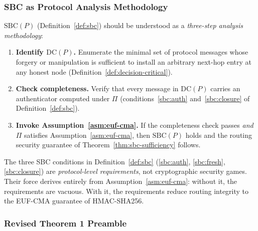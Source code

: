 \subsubsection*{SBC as Protocol Analysis Methodology}

\begin{remark}
\label{rem:sbc-methodology}
$\mathrm{SBC}(P)$ (Definition~\ref{def:sbc}) should be understood as a
\emph{three-step analysis methodology}:

\begin{enumerate}[label=\textbf{Step~\arabic*.}, leftmargin=2.5em]
  \item \textbf{Identify $\mathrm{DC}(P)$.}  Enumerate the minimal set of
        protocol messages whose forgery or manipulation is sufficient to
        install an arbitrary next-hop entry at any honest node
        (Definition~\ref{def:decision-critical}).

  \item \textbf{Check completeness.}  Verify that every message in
        $\mathrm{DC}(P)$ carries an authenticator computed under $\Pi$
        (conditions~\ref{sbc:auth} and~\ref{sbc:closure} of
        Definition~\ref{def:sbc}).

  \item \textbf{Invoke Assumption~\ref{asm:euf-cma}.}  If the
        completeness check passes \emph{and} $\Pi$ satisfies
        Assumption~\ref{asm:euf-cma}, then $\mathrm{SBC}(P)$ holds
        and the routing security guarantee of
        Theorem~\ref{thm:sbc-sufficiency} follows.
\end{enumerate}

The three SBC conditions in Definition~\ref{def:sbc} (\ref{sbc:auth},
\ref{sbc:fresh}, \ref{sbc:closure}) are \emph{protocol-level
requirements}, not cryptographic security games.  Their force derives
entirely from Assumption~\ref{asm:euf-cma}: without it, the
requirements are vacuous.  With it, the requirements reduce routing
integrity to the EUF-CMA guarantee of HMAC-SHA256.
\end{remark}

\subsubsection*{Revised Theorem 1 Preamble}

